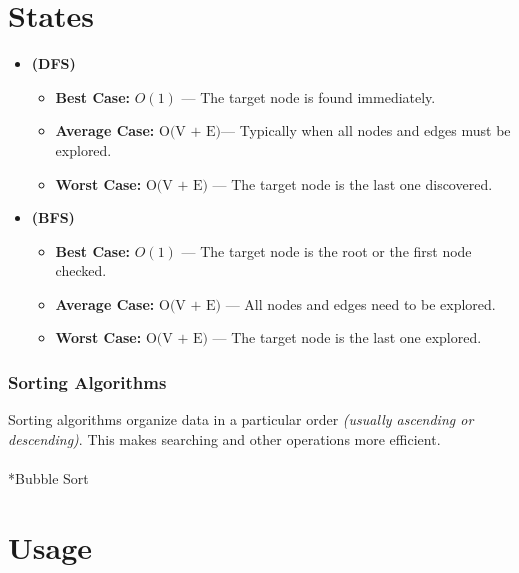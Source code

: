\documentclass[
  letterpaper,
  DIV=11,
  numbers=noendperiod]{scrreprt}
\makeatletter
\let\oldparagraph\paragraph
\renewcommand{\paragraph}{
    \@ifstar
      \xxxParagraphStar
      \xxxParagraphNoStar
  }
\newcommand{\xxxParagraphStar}[1]{\oldparagraph*{#1}\mbox{}}
\newcommand{\xxxParagraphNoStar}[1]{\oldparagraph{#1}\mbox{}}
\providecommand{\tightlist}{%
  \setlength{\itemsep}{0pt}\setlength{\parskip}{0pt}}
\makeatother
\begin{document}
\section{States}

\begin{itemize}
\item
  \textbf{(DFS)}

  \begin{itemize}
  \tightlist
  \item
    \textbf{Best Case:} \(O(1)\) --- The target node is found
    immediately.
  \item
    \textbf{Average Case:} \(\text{O(V + E)}\)--- Typically when all
    nodes and edges must be explored.
  \item
    \textbf{Worst Case:} \(\text{O(V + E)}\) --- The target node is the
    last one discovered.
  \end{itemize}
\item
  \textbf{(BFS)}

  \begin{itemize}
  \tightlist
  \item
    \textbf{Best Case:} \(O(1)\) --- The target node is the root or the
    first node checked.
  \item
    \textbf{Average Case:} \(\text{O(V + E)}\) --- All nodes and edges
    need to be explored.
  \item
    \textbf{Worst Case:} \(\text{O(V + E)}\) --- The target node is the
    last one explored.
  \end{itemize}
\end{itemize}

\subsubsection*{Sorting Algorithms}\label{sorting-algorithms}

Sorting algorithms organize data in a particular order \emph{(usually
ascending or descending)}. This makes searching and other operations
more efficient.

\paragraph*{Bubble Sort}\label{bubble-sort}

\section{Usage}
\end{document}
